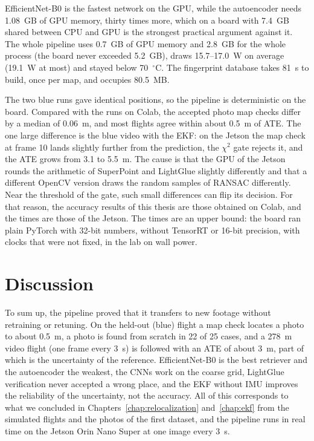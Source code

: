 \documentclass[english, Lau, oneside]{sapthesis}%
\begin{document}
EfficientNet-B0 is the fastest network on the GPU, while the autoencoder needs 1.08~GB of GPU memory, thirty times more, which on a board with 7.4~GB shared between CPU and GPU is the strongest practical argument against it. The whole pipeline uses 0.7~GB of GPU memory and 2.8~GB for the whole process (the board never exceeded 5.2~GB), draws 15.7--17.0~W on average (19.1~W at most) and stayed below 70~$^\circ$C. The fingerprint database takes 81~s to build, once per map, and occupies 80.5~MB.

The two blue runs gave identical positions, so the pipeline is deterministic on the board. Compared with the runs on Colab, the accepted photo map checks differ by a median of 0.06~m, and most flights agree within about 0.5~m of ATE. The one large difference is the blue video with the EKF: on the Jetson the map check at frame 10 lands slightly further from the prediction, the $\chi^2$ gate rejects it, and the ATE grows from 3.1 to 5.5~m. The cause is that the GPU of the Jetson rounds the arithmetic of SuperPoint and LightGlue slightly differently and that a different OpenCV version draws the random samples of RANSAC differently. Near the threshold of the gate, such small differences can flip its decision. For that reason, the accuracy results of this thesis are those obtained on Colab, and the times are those of the Jetson. The times are an upper bound: the board ran plain PyTorch with 32-bit numbers, without TensorRT or 16-bit precision, with clocks that were not fixed, in the lab on wall power.

\clearpage%
\section{Discussion}
\label{sec:real-discussion}
To sum up, the pipeline proved that it transfers to new footage without retraining or retuning. On the held-out (blue) flight a map check locates a photo to about 0.5~m, a photo is found from scratch in 22 of 25 cases, and a 278~m video flight (one frame every 3~s) is followed with an ATE of about 3~m, part of which is the uncertainty of the reference. EfficientNet-B0 is the best retriever and the autoencoder the weakest, the CNNs work on the coarse grid, LightGlue verification never accepted a wrong place, and the EKF without IMU improves the reliability of the uncertainty, not the accuracy. All of this corresponds to what we concluded in Chapters~\ref{chap:relocalization} and~\ref{chap:ekf} from the simulated flights and the photos of the first dataset, and the pipeline runs in real time on the Jetson Orin Nano Super at one image every 3~s.
\end{document}
